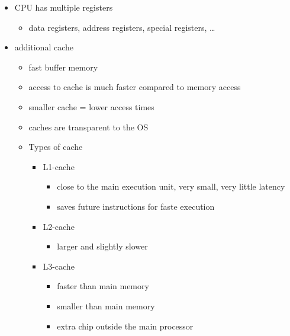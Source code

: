 \begin{itemize}
\tightlist
\item
  CPU has multiple registers

  \begin{itemize}
  \tightlist
  \item
    data registers, address registers, special registers, \ldots{}
  \end{itemize}
\item
  additional cache

  \begin{itemize}
  \tightlist
  \item
    fast buffer memory
  \item
    access to cache is much faster compared to memory access
  \item
    smaller cache = lower access times
  \item
    caches are transparent to the OS
  \item
    Types of cache

    \begin{itemize}
    \tightlist
    \item
      L1-cache

      \begin{itemize}
      \tightlist
      \item
        close to the main execution unit, very small, very little
        latency
      \item
        saves future instructions for faste execution
      \end{itemize}
    \item
      L2-cache

      \begin{itemize}
      \tightlist
      \item
        larger and slightly slower
      \end{itemize}
    \item
      L3-cache

      \begin{itemize}
      \tightlist
      \item
        faster than main memory
      \item
        smaller than main memory
      \item
        extra chip outside the main processor
      \end{itemize}
    \end{itemize}


\end{itemize}
\end{itemize}
